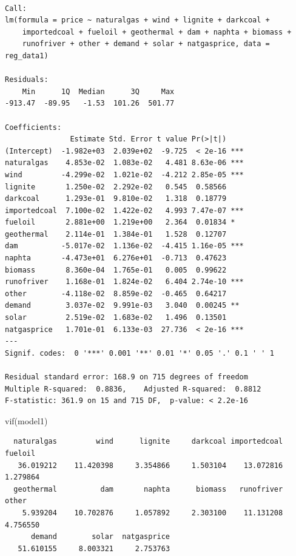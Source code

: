 \documentclass[
  11pt,
  a4paper,
]{article}
\newenvironment{Shaded}{\begin{snugshade}}{\end{snugshade}}
\newcommand{\FunctionTok}[1]{\textcolor[rgb]{0.28,0.35,0.67}{#1}}
\newcommand{\NormalTok}[1]{\textcolor[rgb]{0.00,0.23,0.31}{#1}}
\begin{document}
\begin{verbatim}

Call:
lm(formula = price ~ naturalgas + wind + lignite + darkcoal + 
    importedcoal + fueloil + geothermal + dam + naphta + biomass + 
    runofriver + other + demand + solar + natgasprice, data = reg_data1)

Residuals:
    Min      1Q  Median      3Q     Max 
-913.47  -89.95   -1.53  101.26  501.77 

Coefficients:
               Estimate Std. Error t value Pr(>|t|)    
(Intercept)  -1.982e+03  2.039e+02  -9.725  < 2e-16 ***
naturalgas    4.853e-02  1.083e-02   4.481 8.63e-06 ***
wind         -4.299e-02  1.021e-02  -4.212 2.85e-05 ***
lignite       1.250e-02  2.292e-02   0.545  0.58566    
darkcoal      1.293e-01  9.810e-02   1.318  0.18779    
importedcoal  7.100e-02  1.422e-02   4.993 7.47e-07 ***
fueloil       2.881e+00  1.219e+00   2.364  0.01834 *  
geothermal    2.114e-01  1.384e-01   1.528  0.12707    
dam          -5.017e-02  1.136e-02  -4.415 1.16e-05 ***
naphta       -4.473e+01  6.276e+01  -0.713  0.47623    
biomass       8.360e-04  1.765e-01   0.005  0.99622    
runofriver    1.168e-01  1.824e-02   6.404 2.74e-10 ***
other        -4.118e-02  8.859e-02  -0.465  0.64217    
demand        3.037e-02  9.991e-03   3.040  0.00245 ** 
solar         2.519e-02  1.683e-02   1.496  0.13501    
natgasprice   1.701e-01  6.133e-03  27.736  < 2e-16 ***
---
Signif. codes:  0 '***' 0.001 '**' 0.01 '*' 0.05 '.' 0.1 ' ' 1

Residual standard error: 168.9 on 715 degrees of freedom
Multiple R-squared:  0.8836,    Adjusted R-squared:  0.8812 
F-statistic: 361.9 on 15 and 715 DF,  p-value: < 2.2e-16
\end{verbatim}

\begin{Shaded}
\begin{Highlighting}[]
\FunctionTok{vif}\NormalTok{(model1)}
\end{Highlighting}
\end{Shaded}

\begin{verbatim}
  naturalgas         wind      lignite     darkcoal importedcoal      fueloil 
   36.019212    11.420398     3.354866     1.503104    13.072816     1.279864 
  geothermal          dam       naphta      biomass   runofriver        other 
    5.939204    10.702876     1.057892     2.303100    11.131208     4.756550 
      demand        solar  natgasprice 
   51.610155     8.003321     2.753763 
\end{verbatim}
\end{document}
